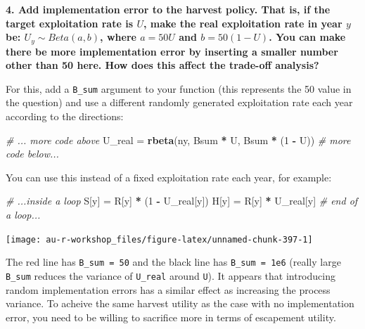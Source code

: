 \documentclass[]{book}
\newenvironment{Shaded}{\begin{snugshade}}{\end{snugshade}}
\newcommand{\KeywordTok}[1]{\textcolor[rgb]{0.13,0.29,0.53}{\textbf{#1}}}
\newcommand{\DecValTok}[1]{\textcolor[rgb]{0.00,0.00,0.81}{#1}}
\newcommand{\StringTok}[1]{\textcolor[rgb]{0.31,0.60,0.02}{#1}}
\newcommand{\CommentTok}[1]{\textcolor[rgb]{0.56,0.35,0.01}{\textit{#1}}}
\newcommand{\OperatorTok}[1]{\textcolor[rgb]{0.81,0.36,0.00}{\textbf{#1}}}
\newcommand{\NormalTok}[1]{#1}
\theoremstyle{definition}
\theoremstyle{definition}
\theoremstyle{definition}
\theoremstyle{remark}
\begin{document}
\textbf{4. Add implementation error to the harvest policy. That is, if
the target exploitation rate is \(U\), make the real exploitation rate
in year \(y\) be: \(U_y \sim Beta(a,b)\), where \(a = 50U\) and
\(b = 50(1-U)\). You can make there be more implementation error by
inserting a smaller number other than 50 here. How does this affect the
trade-off analysis?}

For this, add a \texttt{B\_sum} argument to your function (this
represents the 50 value in the question) and use a different randomly
generated exploitation rate each year according to the directions:

\begin{Shaded}
\begin{Highlighting}[]
\CommentTok{# ... more code above}
\NormalTok{U_real =}\StringTok{ }\KeywordTok{rbeta}\NormalTok{(ny, Bsum }\OperatorTok{*}\StringTok{ }\NormalTok{U, Bsum }\OperatorTok{*}\StringTok{ }\NormalTok{(}\DecValTok{1} \OperatorTok{-}\StringTok{ }\NormalTok{U))}
\CommentTok{# more code below...}
\end{Highlighting}
\end{Shaded}

You can use this instead of a fixed exploitation rate each year, for
example:

\begin{Shaded}
\begin{Highlighting}[]
\CommentTok{# ...inside a loop}
\NormalTok{S[y] =}\StringTok{ }\NormalTok{R[y] }\OperatorTok{*}\StringTok{ }\NormalTok{(}\DecValTok{1} \OperatorTok{-}\StringTok{ }\NormalTok{U_real[y])}
\NormalTok{H[y] =}\StringTok{ }\NormalTok{R[y] }\OperatorTok{*}\StringTok{ }\NormalTok{U_real[y]}
\CommentTok{# end of a loop...}
\end{Highlighting}
\end{Shaded}

\begin{center}\texttt{[image: au-r-workshop\_files/figure-latex/unnamed-chunk-397-1]} \end{center}

The red line has \texttt{B\_sum\ =\ 50} and the black line has
\texttt{B\_sum\ =\ 1e6} (really large \texttt{B\_sum} reduces the
variance of \texttt{U\_real} around \texttt{U}). It appears that
introducing random implementation errors has a similar effect as
increasing the process variance. To acheive the same harvest utility as
the case with no implementation error, you need to be willing to
sacrifice more in terms of escapement utility.
\end{document}
